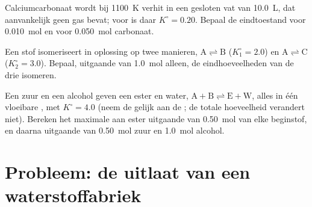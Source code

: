 \begin{exercise}[$\star\star\star$]\label{exo:b1:extent-q-and-k:10}
Calciumcarbonaat wordt bij \qty{1100}{K} verhit in een gesloten vat van
\qty{10.0}{L}, dat aanvankelijk geen gas bevat; voor
 is daar $K^\circ = 0.20$. Bepaal de
eindtoestand voor \qty{0.010}{mol} en voor \qty{0.050}{mol} carbonaat.
\end{exercise}

\begin{exercise}[$\star\star\star$]\label{exo:b1:extent-q-and-k:11}
Een stof  isomeriseert in oplossing op twee manieren,
$\mathrm{A \rightleftharpoons B}$
($K_1^\circ = 2.0$) en $\mathrm{A \rightleftharpoons C}$ ($K_2^\circ = 3.0$). Bepaal, uitgaande
van \qty{1.0}{mol}  alleen, de eindhoeveelheden van de drie
isomeren.
\end{exercise}

\begin{exercise}[$\star\star\star$]\label{exo:b1:extent-q-and-k:12}
Een zuur  en een alcohol  geven een ester en water, $\mathrm{A + B
\rightleftharpoons E + W}$, alles in één vloeibare , met $K^\circ = 4.0$ (neem
de  gelijk aan de ; de totale hoeveelheid
verandert niet). Bereken het maximale  aan ester uitgaande van
\qty{0.50}{mol} van elke beginstof, en daarna uitgaande van
\qty{0.50}{mol} zuur en \qty{1.0}{mol} alcohol.
\end{exercise}

\section{Probleem: de uitlaat van een waterstoffabriek}


